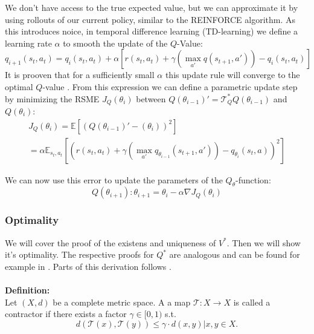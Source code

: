 We don't have access to the true expected value, but we can approximate it by using rollouts of our current policy, similar to the REINFORCE algorithm. As this introduces noice, 
in temporal difference learning (TD-learning) we define a learning rate $\alpha$ to smooth the update of the $Q$-Value:
\begin{equation}
    q_{i+1}(s_t, a_t) = q_i(s_t, a_t) + \alpha\left[r(s_t, a_t) + \gamma \left( \max_{a'} q(s_{t+1}, a')\right) - q_i(s_t, a_t) \right]
\end{equation}
It is prooven that for a sufficiently small $\alpha$ this update rule will converge to the optimal $Q$-value \cite{Watkins1992}. From this expression we can define a parametric update step by minimizing 
the RSME $J_Q(\theta_{i})$ between $Q(\theta_{i-1})' = \mathcal{T}_Q^* Q(\theta_{i-1})$ and $Q(\theta_i)$:
\begin{equation}
    \begin{aligned}
        J_Q(\theta_{i}) = \mathbb{E}\left[\left( Q(\theta_{i-1})' - (\theta_i) \right)^2\right]\\
        = \alpha \mathbb{E}_{s_t, a_t}\left[\left( r(s_t, a_t) + \gamma \left( \max_{a'} q_{\theta_{i-1}}(s_{t+1}, a')\right) - q_{\theta_{i}}(s_t, a)\right)^2\right]
    \end{aligned}
\end{equation}

We can now use this error to update the parameters of the $Q_{\theta}$-function:
\begin{equation}
    Q(\theta_{i+1}) : \theta_{i+1} = \theta_{i} - \alpha \nabla J_Q(\theta_{i})
\end{equation}

\subsubsection{Optimality}
\label{opt_contr}

We will cover the proof of the existens and uniqueness of $V^*$. Then we will show it's optimality. The respective proofs for $Q^*$ are analogous and can be found for example in \cite{Watkins1992}.
Parts of this derivation follows \cite{optimality}.\\ \\

\textbf{Definition:}\\
Let $(X, d)$ be a complete metric space. A a map $\mathcal{T}:X \rightarrow X$ is called a contractor if there exists a factor $\gamma \in [0, 1)$ s.t.
\begin{equation}
    d(\mathcal{T}(x), \mathcal{T}(y)) \leq \gamma \cdot d(x,y) | x,y \in X.
\end{equation}
\\ \\

